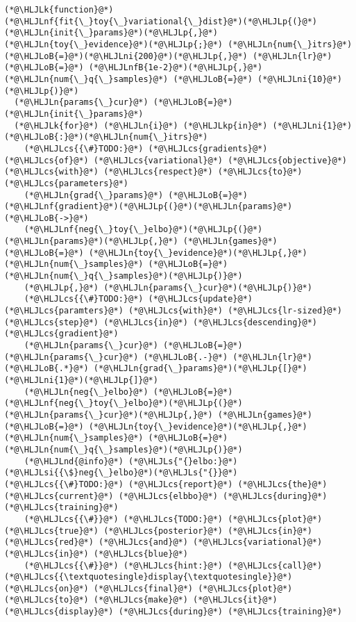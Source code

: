 \documentclass[12pt,a4paper]{article}
\newcommand{\HLJLk}[1]{\textcolor[RGB]{148,91,176}{\textbf{#1}}}
\newcommand{\HLJLkp}[1]{\textcolor[RGB]{148,91,176}{\textbf{#1}}}
\newcommand{\HLJLn}[1]{#1}
\newcommand{\HLJLnd}[1]{\textcolor[RGB]{214,102,97}{#1}}
\newcommand{\HLJLnf}[1]{\textcolor[RGB]{66,102,213}{#1}}
\newcommand{\HLJLs}[1]{\textcolor[RGB]{201,61,57}{#1}}
\newcommand{\HLJLsi}[1]{#1}
\newcommand{\HLJLnfB}[1]{\textcolor[RGB]{59,151,46}{#1}}
\newcommand{\HLJLni}[1]{\textcolor[RGB]{59,151,46}{#1}}
\newcommand{\HLJLoB}[1]{\textcolor[RGB]{102,102,102}{\textbf{#1}}}
\newcommand{\HLJLp}[1]{#1}
\newcommand{\HLJLcs}[1]{\textcolor[RGB]{153,153,119}{\textit{#1}}}
\begin{document}
\begin{lstlisting}
(*@\HLJLk{function}@*) (*@\HLJLnf{fit{\_}toy{\_}variational{\_}dist}@*)(*@\HLJLp{(}@*)(*@\HLJLn{init{\_}params}@*)(*@\HLJLp{,}@*) (*@\HLJLn{toy{\_}evidence}@*)(*@\HLJLp{;}@*) (*@\HLJLn{num{\_}itrs}@*)(*@\HLJLoB{=}@*)(*@\HLJLni{200}@*)(*@\HLJLp{,}@*) (*@\HLJLn{lr}@*)(*@\HLJLoB{=}@*) (*@\HLJLnfB{1e-2}@*)(*@\HLJLp{,}@*) (*@\HLJLn{num{\_}q{\_}samples}@*) (*@\HLJLoB{=}@*) (*@\HLJLni{10}@*)(*@\HLJLp{)}@*)
  (*@\HLJLn{params{\_}cur}@*) (*@\HLJLoB{=}@*) (*@\HLJLn{init{\_}params}@*)
  (*@\HLJLk{for}@*) (*@\HLJLn{i}@*) (*@\HLJLkp{in}@*) (*@\HLJLni{1}@*)(*@\HLJLoB{:}@*)(*@\HLJLn{num{\_}itrs}@*)
    (*@\HLJLcs{{\#}TODO:}@*) (*@\HLJLcs{gradients}@*) (*@\HLJLcs{of}@*) (*@\HLJLcs{variational}@*) (*@\HLJLcs{objective}@*) (*@\HLJLcs{with}@*) (*@\HLJLcs{respect}@*) (*@\HLJLcs{to}@*) (*@\HLJLcs{parameters}@*)
    (*@\HLJLn{grad{\_}params}@*) (*@\HLJLoB{=}@*) (*@\HLJLnf{gradient}@*)(*@\HLJLp{(}@*)(*@\HLJLn{params}@*) (*@\HLJLoB{->}@*)
    (*@\HLJLnf{neg{\_}toy{\_}elbo}@*)(*@\HLJLp{(}@*)(*@\HLJLn{params}@*)(*@\HLJLp{,}@*) (*@\HLJLn{games}@*) (*@\HLJLoB{=}@*) (*@\HLJLn{toy{\_}evidence}@*)(*@\HLJLp{,}@*) (*@\HLJLn{num{\_}samples}@*) (*@\HLJLoB{=}@*) (*@\HLJLn{num{\_}q{\_}samples}@*)(*@\HLJLp{)}@*)
    (*@\HLJLp{,}@*) (*@\HLJLn{params{\_}cur}@*)(*@\HLJLp{)}@*)
    (*@\HLJLcs{{\#}TODO:}@*) (*@\HLJLcs{update}@*) (*@\HLJLcs{paramters}@*) (*@\HLJLcs{with}@*) (*@\HLJLcs{lr-sized}@*) (*@\HLJLcs{step}@*) (*@\HLJLcs{in}@*) (*@\HLJLcs{descending}@*) (*@\HLJLcs{gradient}@*)
    (*@\HLJLn{params{\_}cur}@*) (*@\HLJLoB{=}@*)  (*@\HLJLn{params{\_}cur}@*) (*@\HLJLoB{.-}@*) (*@\HLJLn{lr}@*) (*@\HLJLoB{.*}@*) (*@\HLJLn{grad{\_}params}@*)(*@\HLJLp{[}@*)(*@\HLJLni{1}@*)(*@\HLJLp{]}@*)
    (*@\HLJLn{neg{\_}elbo}@*) (*@\HLJLoB{=}@*) (*@\HLJLnf{neg{\_}toy{\_}elbo}@*)(*@\HLJLp{(}@*)(*@\HLJLn{params{\_}cur}@*)(*@\HLJLp{,}@*) (*@\HLJLn{games}@*) (*@\HLJLoB{=}@*) (*@\HLJLn{toy{\_}evidence}@*)(*@\HLJLp{,}@*) (*@\HLJLn{num{\_}samples}@*) (*@\HLJLoB{=}@*) (*@\HLJLn{num{\_}q{\_}samples}@*)(*@\HLJLp{)}@*)
    (*@\HLJLnd{@info}@*) (*@\HLJLs{"{}elbo:}@*) (*@\HLJLsi{{\$}neg{\_}elbo}@*)(*@\HLJLs{"{}}@*)(*@\HLJLcs{{\#}TODO:}@*) (*@\HLJLcs{report}@*) (*@\HLJLcs{the}@*) (*@\HLJLcs{current}@*) (*@\HLJLcs{elbbo}@*) (*@\HLJLcs{during}@*) (*@\HLJLcs{training}@*)
    (*@\HLJLcs{{\#}}@*) (*@\HLJLcs{TODO:}@*) (*@\HLJLcs{plot}@*) (*@\HLJLcs{true}@*) (*@\HLJLcs{posterior}@*) (*@\HLJLcs{in}@*) (*@\HLJLcs{red}@*) (*@\HLJLcs{and}@*) (*@\HLJLcs{variational}@*) (*@\HLJLcs{in}@*) (*@\HLJLcs{blue}@*)
    (*@\HLJLcs{{\#}}@*) (*@\HLJLcs{hint:}@*) (*@\HLJLcs{call}@*) (*@\HLJLcs{{\textquotesingle}display{\textquotesingle}}@*) (*@\HLJLcs{on}@*) (*@\HLJLcs{final}@*) (*@\HLJLcs{plot}@*) (*@\HLJLcs{to}@*) (*@\HLJLcs{make}@*) (*@\HLJLcs{it}@*) (*@\HLJLcs{display}@*) (*@\HLJLcs{during}@*) (*@\HLJLcs{training}@*)

\end{lstlisting}
\end{document}
